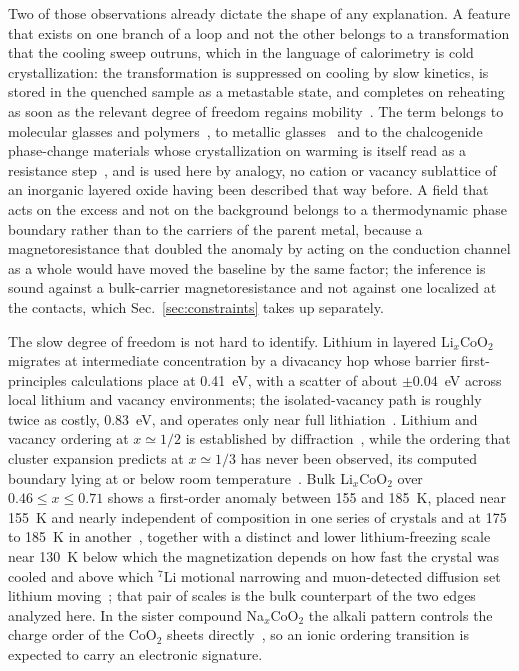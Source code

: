 \documentclass[reprint,twocolumn,prb,amsmath,amssymb,superscriptaddress,floatfix]{revtex4-2}
\begin{document}
Two of those observations already dictate the shape of any explanation. A feature that exists
on one branch of a loop and not the other belongs to a transformation that the cooling sweep
outruns, which in the language of calorimetry is cold crystallization: the transformation is
suppressed on cooling by slow kinetics, is stored in the quenched sample as a metastable
state, and completes on reheating as soon as the relevant degree of freedom regains
mobility~\cite{Wunderlich1958,Wellen2014,Angell1995,Debenedetti2001}. The term belongs to
molecular glasses and polymers~\cite{Wunderlich1958}, to metallic glasses~\cite{Greer1995} and to
the chalcogenide phase-change materials whose crystallization on warming is itself read as a
resistance step~\cite{Wuttig2007,Friedrich2000,Klym2015}, and is used here by analogy, no cation
or vacancy sublattice of an inorganic layered oxide having been described that way before. A
field that acts on the excess and not on the
background belongs to a thermodynamic phase boundary rather than to the carriers of the parent
metal, because a magnetoresistance that doubled the anomaly by acting on the conduction channel
as a whole would have moved the baseline by the same factor; the inference is sound against a
bulk-carrier magnetoresistance and not against one localized at the contacts, which
Sec.~\ref{sec:constraints} takes up separately.

The slow degree of freedom is not hard to identify. Lithium in layered Li$_x$CoO$_2$ migrates
at intermediate concentration by a divacancy hop whose barrier first-principles calculations
place at 0.41~eV, with a scatter of about $\pm0.04$~eV across local lithium and vacancy
environments; the isolated-vacancy path is roughly twice as costly, 0.83~eV, and operates only
near full lithiation~\cite{VanderVen2000,VanderVen2001,VanderVen2001b}. Lithium and vacancy
ordering at $x\simeq1/2$ is established by
diffraction~\cite{Reimers1992,ShaoHorn2003,VanderVen1998}, while the ordering that cluster
expansion predicts at $x\simeq1/3$ has never been observed, its computed boundary lying at or
below room temperature~\cite{VanderVen1998,Wolverton1998,Motohashi2009,Takahashi2007}. Bulk
Li$_x$CoO$_2$ over $0.46\le x\le0.71$ shows a first-order anomaly between 155 and 185~K, placed
near 155~K and nearly independent of composition in one series of crystals and at 175 to 185~K in
another~\cite{Miyoshi2010,Motohashi2009}, together with a distinct and lower lithium-freezing
scale near 130~K below which the magnetization depends on how fast the crystal was cooled and
above which $^{7}$Li motional narrowing and muon-detected diffusion set lithium
moving~\cite{Miyoshi2010,Nakamura2006,Sugiyama2009}; that pair of scales is the bulk counterpart
of the two edges analyzed here. In the sister compound Na$_x$CoO$_2$ the alkali pattern controls
the charge order of the CoO$_2$ sheets directly~\cite{Foo2004,Roger2007}, so an ionic ordering
transition is expected to carry an electronic signature.
\end{document}

